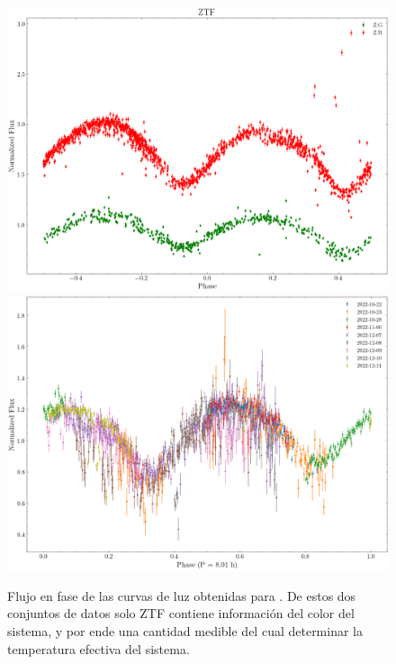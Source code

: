 \begin{figure}[!ht]
	\centering
	\includegraphics[scale=0.4]{Metodologia/Secciones/NormalizacionFlujos/Figures/ZTF Normalized Flux.png}
	\includegraphics[scale=0.4]{Metodologia/Secciones/NormalizacionFlujos/Figures/Iturbide Normalized Flux.png}

	\caption{Flujo en fase de las curvas de luz obtenidas para \atoObjIdNoSpace.
	De estos dos conjuntos de datos solo ZTF contiene información del color del
	sistema, y por ende una cantidad medible del cual determinar la temperatura
	efectiva del sistema.}
	\label{figuraNormFlujosCurvas}
\end{figure}